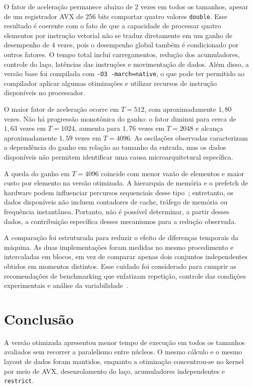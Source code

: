 \documentclass[11pt,a4paper]{article}
\begin{document}
O fator de aceleração permanece abaixo de $2$ vezes em todos os tamanhos, apesar de um registrador AVX de 256 bits comportar quatro valores \texttt{double}. Esse resultado é coerente com o fato de que a capacidade de processar quatro elementos por instrução vetorial não se traduz diretamente em um ganho de desempenho de $4$ vezes, pois o desempenho global também é condicionado por outros fatores. O tempo total inclui carregamentos, redução dos acumuladores, controle do laço, latências das instruções e movimentação de dados. Além disso, a versão base foi compilada com \texttt{-O3 -march=native}, o que pode ter permitido ao compilador aplicar algumas otimizações e utilizar recursos de instrução disponíveis no processador.

O maior fator de aceleração ocorre em $T=512$, com aproximadamente $1{,}80$ vezes. Não há progressão monotônica do ganho: o fator diminui para cerca de $1{,}63$ vezes em $T=1024$, aumenta para $1{,}76$ vezes em $T=2048$ e alcança aproximadamente $1{,}59$ vezes em $T=4096$. As oscilações observadas caracterizam a dependência do ganho em relação ao tamanho da entrada, mas os dados disponíveis não permitem identificar uma causa microarquitetural específica.

A queda do ganho em $T=4096$ coincide com menor vazão de elementos e maior custo por elemento na versão otimizada. A hierarquia de memória e o prefetch de hardware podem influenciar percursos sequenciais desse tipo~\cite{intelOpt2026}; entretanto, os dados disponíveis não incluem contadores de cache, tráfego de memória ou frequência instantânea. Portanto, não é possível determinar, a partir desses dados, a contribuição específica desses mecanismos para a redução observada.

A comparação foi estruturada para reduzir o efeito de diferenças temporais da máquina. As duas implementações foram medidas no mesmo procedimento e intercaladas em blocos, em vez de comparar apenas dois conjuntos independentes obtidos em momentos distintos. Esse cuidado foi considerado para cumprir as recomendações de benchmarking que enfatizam repetição, controle das condições experimentais e análise da variabilidade~\cite{hoefler2015,kalibera2013rigorous,curtsinger2013}.

\section{Conclusão}
A versão otimizada apresentou menor tempo de execução em todos os tamanhos avaliados sem recorrer a paralelismo entre núcleos. O mesmo cálculo e o mesmo layout de dados foram mantidos, enquanto a otimização concentrou-se no kernel por meio de AVX, desenrolamento do laço, acumuladores independentes e \texttt{restrict}.
\end{document}
